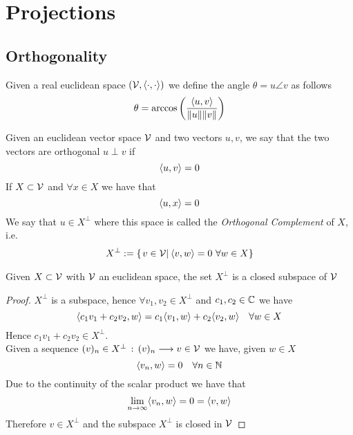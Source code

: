 \documentclass[../complete.tex]{subfiles}
\begin{document}
\section{Projections}
\subsection{Orthogonality}
\begin{dfn}[Angle]
	Given a real euclidean space $(\mathcal{V},\langle \cdot, \cdot \rangle)$ we define the angle $\theta=u\angle v$ as follows
	\begin{equation}
		\theta=\arccos\left( \frac{\langle u, v \rangle}{\norm{u}\norm{v}} \right)
		\label{eq:anglebwvec}
	\end{equation}
\end{dfn}
\begin{dfn}
	Given an euclidean vector space $\mathcal{V}$ and two vectors $u,v$, we say that the two vectors are orthogonal $u\perp v$ if
	\begin{equation}
		\langle u, v \rangle=0
		\label{eq:orthvec}
	\end{equation}
	If $X\subset\mathcal{V}$ and $\forall x\in X$ we have that
	\begin{equation*}
		\langle u, x \rangle=0
	\end{equation*}
	We say that $u\in X^{\perp}$ where this space is called the \textit{Orthogonal Complement} of $X$, i.e.
	\begin{equation}
		X^\perp:=\left\{ \left.v\in\mathcal{V}\right|_{}\langle v, w \rangle=0\ \forall w\in X \right\}
		\label{eq:xbot}
	\end{equation}
\end{dfn}
\begin{thm}
	Given $X\subset\mathcal{V}$ with $\mathcal{V}$ an euclidean space, the set $X^\perp$ is a closed subspace of $\mathcal{V}$
\end{thm}
\begin{proof}
	$X^\perp$ is a subspace, hence $\forall v_1,v_2\in X^\perp$ and $c_1,c_2\in\mathbb{C}$ we have
	\begin{equation*}
		\langle c_1v_1+c_2v_2, w \rangle=c_1\langle v_1, w \rangle+c_2\langle v_2, w \rangle\quad\forall w\in X
	\end{equation*}
	Hence $c_1v_1+c_2v_2\in X^\perp$.\\
	Given a sequence $(v)_n\in X^{\perp}\, :\, (v)_n\overset{}{\longrightarrow} v\in\mathcal{V}$ we have, given $w\in X$
	\begin{equation*}
		\langle v_n, w \rangle=0\quad\forall n\in\mathbb{N}
	\end{equation*}
	Due to the continuity of the scalar product we have that
	\begin{equation*}
		\lim_{n\to\infty}\langle v_n, w \rangle=0=\langle v, w \rangle
	\end{equation*}
	Therefore $v\in X^\perp$ and the subspace $X^\perp$ is closed in $\mathcal{V}$
\end{proof}
\end{document}
